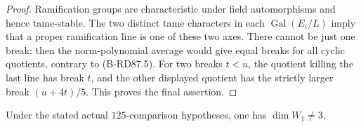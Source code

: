 \begin{proof}
Ramification groups are characteristic under
field automorphisms and hence tame-stable.
The two distinct tame characters in each
\(\operatorname{Gal}(E_i/L)\) imply that a proper
ramification line is one of these two axes.
There cannot be just one break: then the
norm-polynomial average would give equal breaks
for all cyclic quotients, contrary to (B-RD87.5).
For two breaks \(t<u\), the quotient killing the
last line has break \(t\), and the other displayed
quotient has the strictly larger break
\((u+4t)/5\). This proves the final assertion.
\end{proof}

\begin{proposition}[Three first-layer dimensions are impossible at \(p=5\)]
\label{prop:B-RD87-three}
Under the stated actual \(125\)-comparison hypotheses,
one has \(\dim W_1\ne3\).
\end{proposition}
